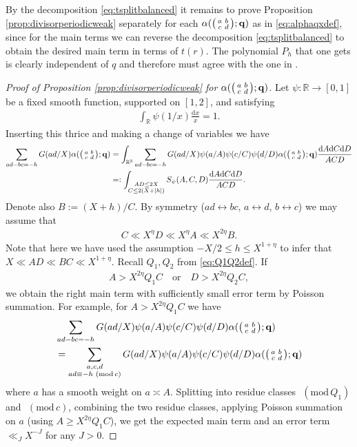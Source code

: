 \documentclass[12pt]{amsart}
\theoremstyle{definition}
\theoremstyle{remark}
\numberwithin{equation}{section}
\newcommand{\R}{{\mathbb R}}
\newcommand{\1}{{\mathbf 1}}
\renewcommand{\c}{\mathfrak c}
\renewcommand{\d}{\mathrm d}
\renewcommand{\pmod}[1]{\,\,(\mathrm{mod}\,{#1})}
\begin{document}
By the decomposition \eqref{eq:tsplitbalanced} it remains to prove Proposition \ref{prop:divisorperiodicweak}  separately for each $\alpha(\smqty(a & b \\c & d);\mathbf{q})$  as in \eqref{eq:alphaqxdef}, since for the main terms we can reverse the decomposition \eqref{eq:tsplitbalanced} to obtain the desired main term in terms of $t(r)$.  The polynomial $P_h$ that one gets is clearly independent of $q$ and therefore must agree with the one in \cite{Motohashidivisor}.

\begin{proof}[Proof of Proposition \ref{prop:divisorperiodicweak} for $ \alpha(\smqty(a & b \\c & d);\mathbf{q})$]
   Let $\psi:\R \to [0,1]$ be a fixed smooth function, supported on $[1,2]$, and satisfying
\begin{align*}
    \int_\R \psi(1/x) \frac{\d x}{x} = 1.
\end{align*}
Inserting this thrice and making a change of variables we have
\begin{align*}
  \sum_{ \substack{ad-bc=-h}} G(ad/X) \alpha(\smqty(a & b \\c & d);\mathbf{q})&=\int_{\R^3} \sum_{\substack{ad-bc=-h}} G(ad/X)\psi(a/A)\psi(c/C)\psi(d/D)\alpha(\smqty(a & b \\c & d);\mathbf{q}) \frac{\d A \d C \d D}{ACD} \\
    &=: \int_{\substack{ A D \leq 2 X \\ C \leq 2(X+|h|)}} S_{\psi}(A,C,D) \frac{\d A \d C \d D}{ACD}.
\end{align*}
Denote also $B := (X+h)/C$.  By symmetry ($ad \leftrightarrow bc$, $a \leftrightarrow d$, $b \leftrightarrow c$) we may assume that
\begin{align*}
    C \ll  X^\eta D \ll X^\eta A \ll  X^{2\eta} B.
\end{align*}
Note that here we have used the assumption $-X/2\leq h \leq X^{1+\eta}$ to infer that $X \ll AD \ll BC \ll X^{1+\eta} .$ Recall $Q_1,Q_2$ from \eqref{eq:Q1Q2def}. If
\begin{align}\label{eq:trivialrangedivisor}
   A > X^{2\eta} Q_1 C \quad \text{or} \quad D > X^{2\eta} Q_2 C,
\end{align}
we obtain the right  main term with sufficiently small error term by Poisson summation. For example, for $ A > X^{2\eta} Q_1 C $ we have
\begin{align*}
    &\sum_{\substack{ad-bc=-h}} G(ad/X)\psi(a/A)\psi(c/C)\psi(d/D) \alpha(\smqty(a & b \\c & d);\mathbf{q}) \\
    & = \sum_{\substack{a,c,d \\ad \equiv -h \pmod {c}}} G(ad/X)\psi(a/A)\psi(c/C)\psi(d/D) \alpha(\smqty(a & b \\c & d);\mathbf{q})
\end{align*}
where $a$ has a smooth weight on $a \asymp A$. Splitting into residue classes $\pmod{ Q_1}$ and $\pmod{c}$, combining the two residue classes,  applying Poisson summation on $a$ (using $A \geq X^{2\eta}  Q_1 C$),  we get the expected main term and an error term $\ll_J X^{-J}$ for any $J>0$.



\end{proof}
\end{document}
